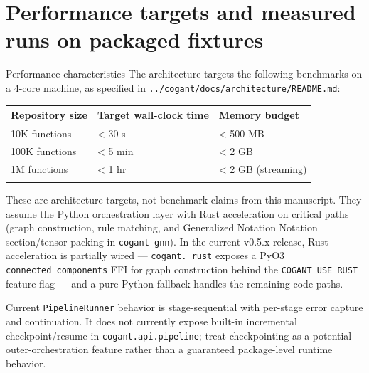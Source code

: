 \documentclass[
  ignorenonframetext,
]{beamer}
\author{\texorpdfstring{}{}}
\date{}
\newcounter{none} %
\begin{document}
\section{Performance targets and measured runs on packaged
fixtures}\label{performance-targets-and-measured-runs-on-packaged-fixtures}

\begin{frame}[fragile]{Performance characteristics}
\protect{}\label{performance-characteristics}
The architecture targets the following benchmarks on a 4-core machine,
as specified in \texttt{../cogant/docs/architecture/README.md}:

{\def\LTcaptype{none} %
\begin{longtable}[]{@{}lll@{}}
\toprule\noalign{}
Repository size & Target wall-clock time & Memory budget \\
\midrule\noalign{}
\endhead
10K functions & \textless{} 30 s & \textless{} 500 MB \\
100K functions & \textless{} 5 min & \textless{} 2 GB \\
1M functions & \textless{} 1 hr & \textless{} 2 GB (streaming) \\
\bottomrule\noalign{}
\end{longtable}
}

These are architecture targets, not benchmark claims from this
manuscript. They assume the Python orchestration layer with Rust
acceleration on critical paths (graph construction, rule matching, and
Generalized Notation Notation section/tensor packing in
\texttt{cogant-gnn}). In the current v0.5.x release, Rust acceleration
is partially wired --- \texttt{cogant.\_rust} exposes a PyO3
\texttt{connected\_components} FFI for graph construction behind the
\texttt{COGANT\_USE\_RUST} feature flag --- and a pure-Python fallback
handles the remaining code paths.

Current \texttt{PipelineRunner} behavior is stage-sequential with
per-stage error capture and continuation. It does not currently expose
built-in incremental checkpoint/resume in \texttt{cogant.api.pipeline};
treat checkpointing as a potential outer-orchestration feature rather
than a guaranteed package-level runtime behavior.
\end{frame}
\end{document}

